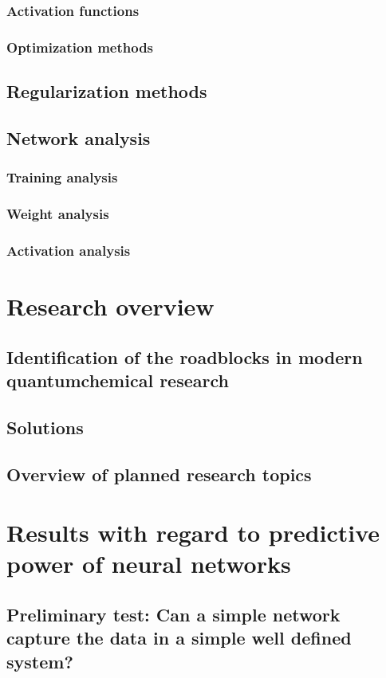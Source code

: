 \documentclass[]{report}
\begin{document}
\subsubsection{Activation functions}
\subsubsection{Optimization methods}
\subsection{Regularization methods}

\subsection{Network analysis}
\subsubsection{Training analysis}
\subsubsection{Weight analysis}
\subsubsection{Activation analysis}


\section{Research overview}
\subsection{Identification of the roadblocks in modern quantumchemical research}
\subsection{Solutions}
\subsection{Overview of planned research topics}


\section{Results with regard to predictive power of neural networks}

\subsection{Preliminary test: Can a simple network capture the data in a simple well defined system?}
\end{document}

